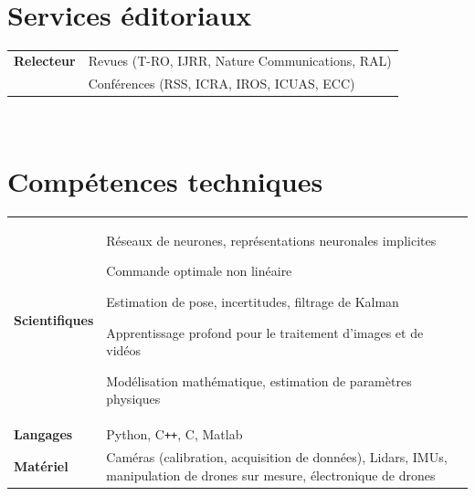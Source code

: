 \documentclass[10pt]{article}
\newlength{\annee}
\newlength{\texte}
\def\Plus{\texttt{+}}
\begin{document}
~\\[0.2cm]
\section{Services éditoriaux}

\begin{tabular}{@{}p{\annee}p{\texte}@{}}
	\bf Relecteur		& 	Revues (T-RO, IJRR, Nature Communications, RAL) \\
	~					& 	Conférences (RSS, ICRA, IROS, ICUAS, ECC)
\end{tabular}


~\\[0.2cm]
\section{Compétences techniques}

\begin{tabular}{@{}p{\annee}p{\texte}@{}}
	\bf Scientifiques		& 	Réseaux de neurones, représentations neuronales implicites \par
							Commande optimale non linéaire \par
							Estimation de pose, incertitudes, filtrage de Kalman \par
							Apprentissage profond pour le traitement d'images et de vidéos \par
							Modélisation mathématique, estimation de paramètres physiques \\
	\bf Langages 		& 	Python, {C\Plus\Plus}, C, Matlab \\
	\bf Matériel 		& 	Caméras (calibration, acquisition de données), Lidars, IMUs, manipulation de drones sur mesure, électronique de drones
\end{tabular}


~\\[0.2cm]
\end{document}
